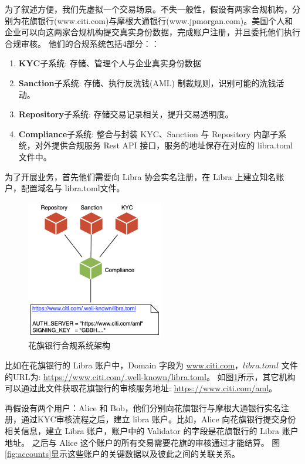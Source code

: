 为了叙述方便，我们先虚拟一个交易场景。不失一般性，假设有两家合规机构，分别为花旗银行(www.citi.com)与摩根大通银行(www.jpmorgan.com)。美国个人和企业可以向这两家合规机构提交真实身份数据，完成账户注册，并且委托他们执行合规审核。
他们的合规系统包括4部分：：
\begin{enumerate}
    \item \textbf{KYC}子系统:      存储、管理个人与企业真实身份数据
    \item \textbf{Sanction}子系统: 存储、执行反洗钱(AML) 制裁规则，识别可能的洗钱活动。
    \item \textbf{Repository}子系统: 存储交易记录相关，提升交易透明度。
    \item \textbf{Compliance}子系统: 整合与封装 KYC、Sanction 与 Repository 内部子系统，对外提供合规服务 Rest API 接口，服务的地址保存在对应的 libra.toml 文件中。
\end{enumerate}

为了开展业务，首先他们需要向 Libra 协会实名注册，在 Libra 上建立知名账户，配置域名与 libra.toml文件。

\begin{figure}[h!]
    \centering
    \includegraphics[width=6cm, keepaspectratio]{images/citi.png}
    \caption{花旗银行合规系统架构}
    \label{fig:citi}
\end{figure}


比如在花旗银行的 Libra 账户中，Domain 字段为 \url{www.citi.com}，$libra.toml$ 文件的URL为: \url{https://www.citi.com/.well-known/libra.toml}。
如图\ref{fig:citi}所示，其它机构可以通过此文件获取花旗银行的审核服务地址: \url{https://www.citi.com/aml}。

再假设有两个用户：Alice 和 Bob，他们分别向花旗银行与摩根大通银行实名注册，通过KYC审核流程之后，建立 libra 账户。比如，Alice 向花旗银行提交身份相关信息，建立 Libra 账户，账户中的 Validator 的字段是花旗银行的 Libra 账户地址。
之后与 Alice 这个账户的所有交易需要花旗的审核通过才能结算。
图\ref{fig:accounts}显示这些账户的关键数据以及彼此之间的关联关系。

